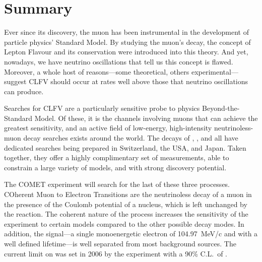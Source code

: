 \chapter{Summary}

Ever since its discovery, the muon has been instrumental in the development of particle physics' Standard Model.
By studying the muon's decay, the concept of Lepton Flavour and its conservation were introduced into this theory.
And yet, nowadays, we have neutrino oscillations that tell us this concept is flawed.
Moreover, a whole host of reasons---some theoretical, others experimental---suggest \ac{CLFV} should occur at rates well above those that neutrino oscillations can produce.

Searches for \ac{CLFV} are a particularly sensitive probe to physics Beyond-the-Standard Model.
Of these, it is the channels involving muons that can achieve the greatest sensitivity, and an active field of low-energy, high-intensity neutrinoless-muon decay searches exists around the world.
The decays of \muegamma, \muThreeE, and \muec all have dedicated searches being prepared in Switzerland, the USA, and Japan.
Taken together, they offer a highly complimentary set of measurements, able to constrain a large variety of models, and with strong discovery potential.

The COMET experiment will search for the last of these three processes.
COherent Muon to Electron Transitions are the neutrinoless decay of a muon in the presence of the Coulomb potential of a nucleus, which is left unchanged by the reaction.
The coherent nature of the process increases the sensitivity of the experiment to certain models compared to the other possible decay modes.
In addition, the signal---a single monoenergetic electron of 104.97~MeV/c and with a well defined lifetime---is well separated from most background sources.
The current limit on \mueconv was set in 2006 by the \sindrumII experiment with a 90\% C.L.\ of  \senseSindrum.

